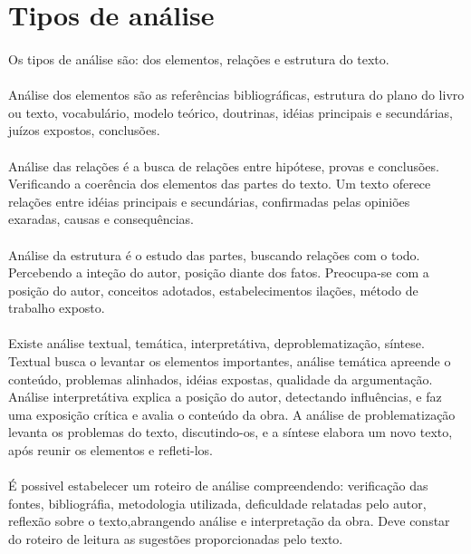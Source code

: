 \section{Tipos de análise}

\paragraph{}
Os tipos de análise são: dos elementos, relações e estrutura do texto.

\paragraph{}
Análise dos elementos são as referências bibliográficas, estrutura do plano do livro ou texto, vocabulário, modelo teórico, doutrinas, idéias principais e secundárias, juízos expostos, conclusões.

\paragraph{}
Análise das relações é a busca de relações entre hipótese, provas e conclusões. Verificando a coerência dos elementos das partes do texto. Um texto oferece relações entre idéias principais e secundárias, confirmadas pelas opiniões exaradas, causas e consequências.

\paragraph{}
Análise da estrutura é o estudo das partes, buscando relações com o todo. Percebendo a inteção do autor, posição diante dos fatos. Preocupa-se com a posição do autor, conceitos adotados, estabelecimentos ilações, método de trabalho exposto.

\paragraph{}
Existe análise textual, temática, interpretátiva, deproblematização, síntese. Textual busca o levantar os elementos importantes, análise temática apreende o conteúdo, problemas alinhados, idéias expostas, qualidade da argumentação. Análise interpretátiva explica a posição do autor, detectando influências, e faz uma exposição crítica e avalia o conteúdo da obra. A análise de problematização levanta os problemas do texto, discutindo-os, e a síntese elabora um novo texto, após reunir os elementos e refleti-los.

\paragraph{}
É possivel estabelecer um roteiro de análise compreendendo: verificação das fontes, bibliográfia, metodologia utilizada, deficuldade relatadas pelo autor, reflexão sobre o texto,abrangendo análise e interpretação da obra. Deve constar do roteiro de leitura as sugestões proporcionadas pelo texto.

